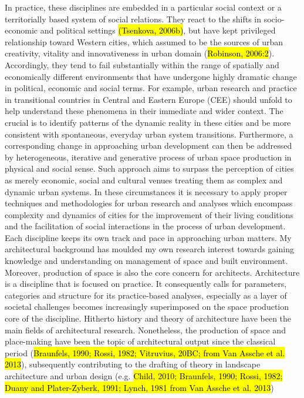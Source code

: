 \documentclass[11pt]{report}
\begin{document}
In practice, these disciplines are embedded in a particular social context or a territorially based system of social relations. They react to the shifts in socio-economic and political settings \hl{(Tsenkova, 2006b)}, but have kept privileged relationship toward Western cities, which assumed to be the sources of urban creativity, vitality and innovativeness in urban domain (\hl{Robinson, 2006:2}). Accordingly, they tend to fail substantially within the range of spatially and economically different environments that have undergone highly dramatic change in political, economic and social terms. For example, urban research and practice in transitional countries in Central and Eastern Europe (CEE) should unfold to help understand these phenomena in their immediate and wider context. The crucial is to identify patterns of the dynamic reality in these cities and be more consistent with spontaneous, everyday urban system transitions. Furthermore, a corresponding change in approaching urban development can then be addressed by heterogeneous, iterative and generative process of urban space production in physical and social sense. Such approach aims to surpass the perception of cities as merely economic, social and cultural venues treating them as complex and dynamic urban systems. In these circumstances it is necessary to apply proper techniques and methodologies for urban research and analyses which encompass complexity and dynamics of cities for the improvement of their living conditions and the facilitation of social interactions in the process of urban development.
\\
Each discipline keeps its own track and pace in approaching urban matters. My architectural background has moulded my own research interest towards gaining knowledge and understanding on management of space and built environment. Moreover, production of space is also the core concern for architects. Architecture is a discipline that is focused on practice. It consequently calls for parameters, categories and structure for its practice-based analyses, especially as a layer of societal challenges becomes increasingly superimposed on the space production core of the discipline.  
Hitherto history and theory of architecture have been the main fields of architectural research.
Nonetheless, the production of space and place-making have been the topic of architectural output since the classical period  (\hl{Braunfels, 1990; Rossi, 1982; Vitruvius, 20BC; from Van Assche et al. 2013}), subsequently contributing to the drafting of theory in landscape architecture and urban design (e.g. \hl{Child, 2010; Braunfels, 1990; Rossi, 1982; Duany and Plater-Zyberk, 1991; Lynch, 1981 from Van Assche et al. 2013})
\end{document}

